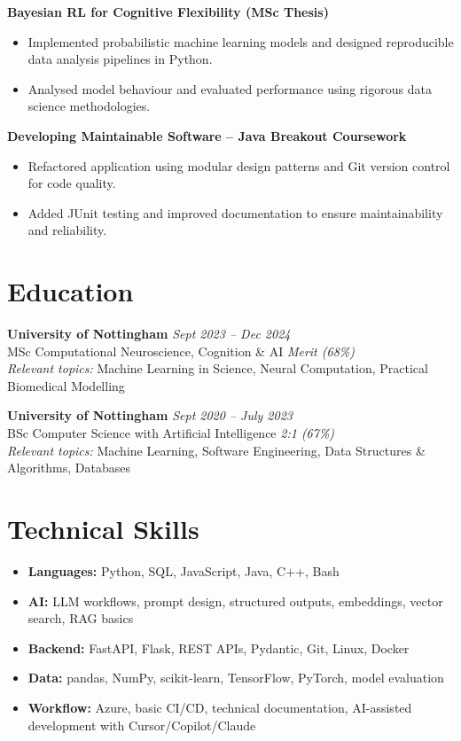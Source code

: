 \documentclass[a4paper,10pt]{article}
\begin{document}
\textbf{Bayesian RL for Cognitive Flexibility (MSc Thesis)}
\begin{itemize}
    \item Implemented probabilistic machine learning models and designed reproducible data analysis pipelines in Python.
    \item Analysed model behaviour and evaluated performance using rigorous data science methodologies.
\end{itemize}

\textbf{Developing Maintainable Software -- Java Breakout Coursework}
\begin{itemize}
    \item Refactored application using modular design patterns and Git version control for code quality.
    \item Added JUnit testing and improved documentation to ensure maintainability and reliability.
\end{itemize}

\section*{Education}
\textbf{University of Nottingham} \hfill \textit{Sept 2023 -- Dec 2024}\\
MSc Computational Neuroscience, Cognition \& AI \hfill \textit{Merit (68\%)}\\
\textit{Relevant topics:} Machine Learning in Science, Neural Computation, Practical Biomedical Modelling

\vspace{2pt}
\textbf{University of Nottingham} \hfill \textit{Sept 2020 -- July 2023}\\
BSc Computer Science with Artificial Intelligence \hfill \textit{2:1 (67\%)}\\
\textit{Relevant topics:} Machine Learning, Software Engineering, Data Structures \& Algorithms, Databases

\section*{Technical Skills}
\begin{itemize}
    \item \textbf{Languages:} Python, SQL, JavaScript, Java, C++, Bash
    \item \textbf{AI:} LLM workflows, prompt design, structured outputs, embeddings, vector search, RAG basics
    \item \textbf{Backend:} FastAPI, Flask, REST APIs, Pydantic, Git, Linux, Docker
    \item \textbf{Data:} pandas, NumPy, scikit-learn, TensorFlow, PyTorch, model evaluation
    \item \textbf{Workflow:} Azure, basic CI/CD, technical documentation, AI-assisted development with Cursor/Copilot/Claude
\end{itemize}
\end{document}

